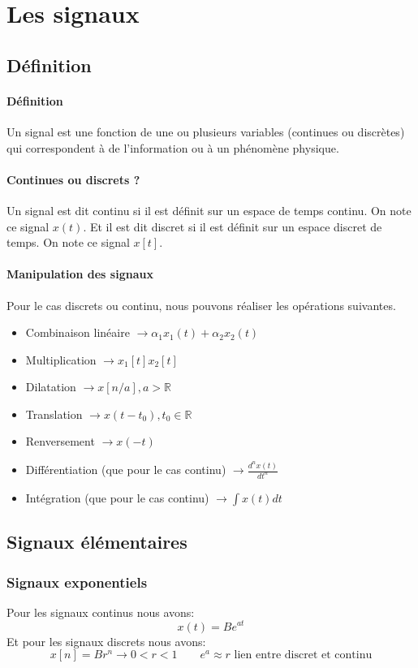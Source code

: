 \documentclass{report}
\begin{document}
\chapter{Les signaux}
\section{Définition}
\subsubsection{Définition}
Un signal est une fonction de une ou plusieurs variables (continues ou discrètes) qui correspondent à de l'information ou à un phénomène physique.

\subsubsection{Continues ou discrets ?}
Un signal est dit continu si il est définit sur un espace de temps continu. On note ce signal $x(t)$. Et il est dit discret si il est définit sur un espace discret de temps. On note ce signal $x[t]$.

\subsubsection{Manipulation des signaux}
Pour le cas discrets ou continu, nous pouvons réaliser les opérations suivantes.
\begin{itemize}
\item Combinaison linéaire $\rightarrow \alpha_{1}x_{1}(t) + \alpha_{2}x_{2}(t)$
\item Multiplication $ \rightarrow x_{1}[t]x_{2}[t]$
\item Dilatation $ \rightarrow x[n/a], a > \mathbb{R}$
\item Translation $ \rightarrow x(t - t_0), t_0 \in \mathbb{R}$
\item Renversement $ \rightarrow x(-t)$
\item Différentiation (que pour le cas continu) $ \rightarrow \frac{d^n x(t)}{dt^n}$
\item Intégration (que pour le cas continu) $\rightarrow \int x(t) dt$
\end{itemize}

\section{Signaux élémentaires}
\subsection{Signaux exponentiels}
\noindent
Pour les signaux continus nous avons:
\begin{equation}
x(t) = B e^{at}
\end{equation}
\noindent
Et pour les signaux discrets nous avons:
\begin{equation}
x[n] = Br^n \rightarrow 0 < r < 1 \qquad e^a \approx r \text{ lien entre discret et continu}
\end{equation}
\end{document}
